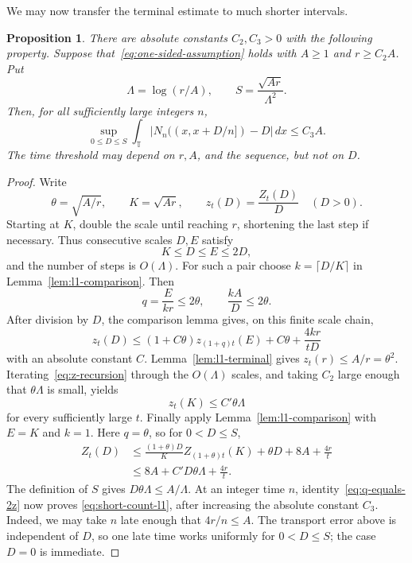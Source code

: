 \documentclass[11pt]{article}
\newtheorem{proposition}[theorem]{Proposition}
\theoremstyle{remark}
\numberwithin{equation}{section}
\newcommand{\T}{\mathbb{T}}
\begin{document}
We may now transfer the terminal estimate to much shorter intervals.
\begin{proposition}\label{prop:short-l1}
There are absolute constants $C_2,C_3>0$ with the following property.
Suppose that~\eqref{eq:one-sided-assumption} holds with $A\geq1$ and
$r\geq C_2A$. Put
\[
  \Lambda=\log(r/A),
  \qquad
  S=\frac{\sqrt{Ar}}{\Lambda^2}.
\]
Then, for all sufficiently large integers $n$,
\begin{equation}\label{eq:short-count-l1}
  \sup_{0\leq D\leq S}
  \int_{\T}\left|N_n((x,x+D/n])-D\right|\,dx
  \leq C_3A.
\end{equation}
The time threshold may depend on $r,A$, and the sequence, but not on $D$.
\end{proposition}
\begin{proof}
Write
\[
  \theta=\sqrt{A/r},
  \qquad
  K=\sqrt{Ar},
  \qquad
  z_t(D)=\frac{Z_t(D)}D \quad(D>0).
\]
Starting at $K$, double the scale until reaching $r$, shortening the last
step if necessary. Thus consecutive scales $D,E$ satisfy
\[
  K\leq D\leq E\leq2D,
\]
and the number of steps is $O(\Lambda)$. For such a pair choose
$k=\lceil D/K\rceil$ in Lemma~\ref{lem:l1-comparison}. Then
\[
  q=\frac{E}{kr}\leq2\theta,
  \qquad
  \frac{kA}{D}\leq2\theta.
\]
After division by $D$, the comparison lemma gives, on this finite scale
chain,
\begin{equation}\label{eq:z-recursion}
  z_t(D)\leq(1+C\theta)z_{(1+q)t}(E)+C\theta
            +\frac{4kr}{tD}
\end{equation}
with an absolute constant $C$. Lemma~\ref{lem:l1-terminal} gives
$z_t(r)\leq A/r=\theta^2$. Iterating~\eqref{eq:z-recursion} through the
$O(\Lambda)$ scales, and taking $C_2$ large enough that
$\theta\Lambda$ is small, yields
\begin{equation}\label{eq:z-middle}
  z_t(K)\leq C'\theta\Lambda
\end{equation}
for every sufficiently large $t$.
Finally apply Lemma~\ref{lem:l1-comparison} with $E=K$ and $k=1$. Here
$q=\theta$, so for $0<D\leq S$,
\[
  \begin{aligned}
  Z_t(D)
  &\leq \frac{(1+\theta)D}{K}Z_{(1+\theta)t}(K)
       +\theta D+8A+\frac{4r}{t}\\
  &\leq 8A+C'D\theta\Lambda+\frac{4r}{t}.
  \end{aligned}
\]
The definition of $S$ gives $D\theta\Lambda\leq A/\Lambda$. At an
integer time $n$, identity~\eqref{eq:q-equals-2z} now proves
\eqref{eq:short-count-l1}, after increasing the absolute constant $C_3$.
Indeed, we may take $n$ late enough that $4r/n\leq A$. The transport error
above is independent of $D$, so one late time works
uniformly for $0<D\leq S$; the case $D=0$ is immediate.
\end{proof}
\end{document}
